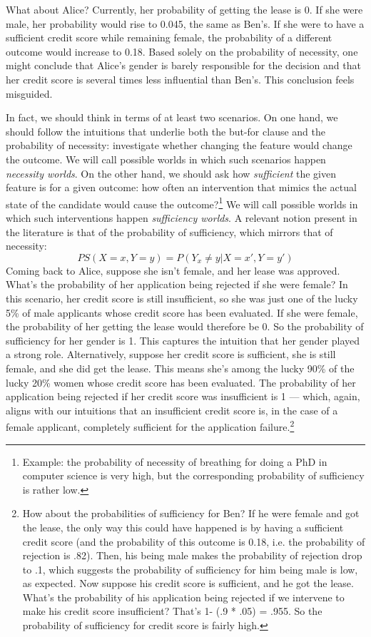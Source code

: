 \documentclass{article}
\begin{document}
What about Alice? Currently, her probability of getting the lease is 0. If she were male, her probability would rise to 0.045, the same as Ben's. If she were to have a sufficient credit score while remaining female, the probability of a different outcome would increase to 0.18. Based solely on the probability of necessity, one might conclude that Alice's gender is barely responsible for the decision and that her credit score is several times less influential than Ben's. This conclusion feels misguided.

In fact, we should think in terms of at least two scenarios. On one hand, we should follow the intuitions that underlie both the but-for clause and the probability of necessity: investigate whether changing the feature would change the outcome. We will call possible worlds in which such scenarios happen \emph{necessity worlds}. On the other hand, we should ask how \emph{sufficient} the given feature is for a given outcome: how often an intervention that mimics the actual state of the candidate would cause the outcome?\footnote{Example:  the probability of necessity of breathing for doing a PhD in computer science is very high, but the corresponding probability of sufficiency is rather low.}   We will call possible worlds in which such interventions happen \emph{sufficiency worlds}. A relevant notion present in the literature is that of the probability of sufficiency, which mirrors that of necessity:
$$ PS(X=x, Y=y) = P(Y_{x} \neq y \vert X=x', Y=y')$$
Coming back to Alice, suppose she isn't female, and her lease was approved. What's the probability of her application being rejected if she were female?
In this scenario, her credit score is still insufficient, so she was just one of the lucky 5\% of male applicants whose credit score has been evaluated. If she were female, the probability of her getting the lease would therefore be 0. So the probability of sufficiency for her gender is 1. This captures the intuition that her gender played a strong role. Alternatively, suppose her credit score is sufficient, she is still female, and she did get the lease. This means she's among the lucky 90\% of the lucky 20\% women whose credit score has been evaluated. The probability of her application being rejected if her credit score was insufficient is 1 --- which, again, aligns with our intuitions that an insufficient credit score is, in the case of a female applicant, completely sufficient for the application failure.\footnote{How about the probabilities of sufficiency for Ben? If he were female and got the lease, the only way this could have happened is by having a sufficient credit score (and the probability of this outcome is 0.18, i.e. the probability of rejection is  .82). Then, his being male makes the probability of rejection drop to .1, which suggests the probability of sufficiency for him being male is low, as expected. Now suppose his credit score is sufficient, and he got the lease. What's the probability of his application being rejected if we intervene to make his credit score insufficient?  That's 1- (.9 * .05) = .955. So the probability of sufficiency for credit score is fairly high.}
\end{document}
